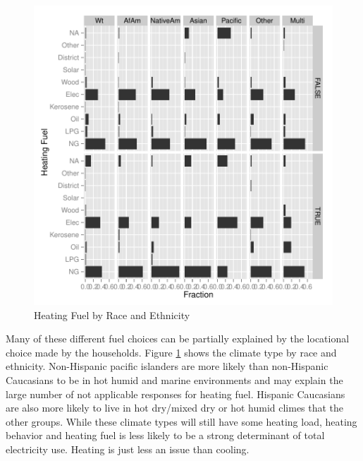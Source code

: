 \documentclass{article}
\begin{document}
\begin{figure}[htbp]
\begin{center}
\caption{Heating Fuel by Race and Ethnicity}
\label{fig:HeatFuel}
\includegraphics{DraftEdwardsWoods-008}
\end{center}
\end{figure}


Many of these different fuel choices can be partially explained by the locational choice made by the households.  Figure \ref{fig:HeatFuel} shows the climate type by race and ethnicity.  Non-Hispanic pacific islanders are more likely than non-Hispanic Caucasians to be in hot humid and marine environments and may explain the large number of not applicable responses for heating fuel.  Hispanic Caucasians are also more likely to live in hot dry/mixed dry or hot humid climes that the other groups.  While these climate types will still have some heating load, heating behavior and heating fuel is less likely to be a strong determinant of total electricity use.  Heating is just less an issue than cooling. 
\end{document}
